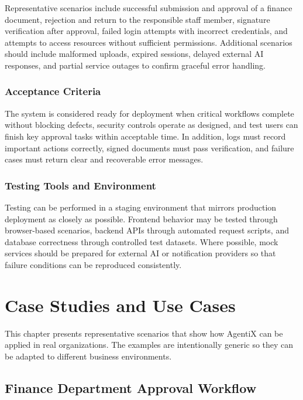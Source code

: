 \documentclass[12pt,oneside,openright,a4paper]{cpe-english-project}
\begin{document}
Representative scenarios include successful submission and approval of a finance document, rejection and return to the responsible staff member, signature verification after approval, failed login attempts with incorrect credentials, and attempts to access resources without sufficient permissions. Additional scenarios should include malformed uploads, expired sessions, delayed external AI responses, and partial service outages to confirm graceful error handling.

\subsubsection{Acceptance Criteria}

The system is considered ready for deployment when critical workflows complete without blocking defects, security controls operate as designed, and test users can finish key approval tasks within acceptable time. In addition, logs must record important actions correctly, signed documents must pass verification, and failure cases must return clear and recoverable error messages.

\subsubsection{Testing Tools and Environment}

Testing can be performed in a staging environment that mirrors production deployment as closely as possible. Frontend behavior may be tested through browser-based scenarios, backend APIs through automated request scripts, and database correctness through controlled test datasets. Where possible, mock services should be prepared for external AI or notification providers so that failure conditions can be reproduced consistently.

\section{Case Studies and Use Cases}

This chapter presents representative scenarios that show how AgentiX can be applied in real organizations. The examples are intentionally generic so they can be adapted to different business environments.

\subsection{Finance Department Approval Workflow}
\end{document}
